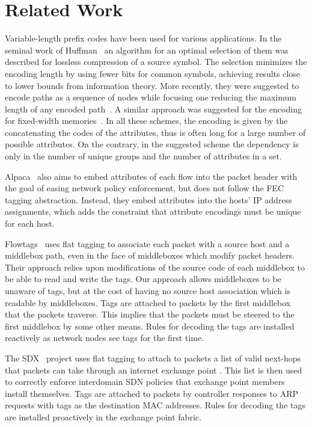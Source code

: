 \section{Related Work} \label{sec:related}

Variable-length prefix codes have been used for various applications. In the seminal work of Huffman~\cite{Huffman} an algorithm for an optimal selection of them was described for lossless compression of a source symbol. The selection minimizes the encoding length by using fewer bits for common symbols, achieving results close to lower bounds from information theory. More recently, they were suggested to encode paths as a sequence of nodes while focusing one reducing the maximum length of any encoded path~\cite{PathEncoding}. A similar approach was suggested for the encoding for fixed-width memories~\cite{FixedMemories}. In all these schemes, the encoding is given by the concatenating the codes of the attributes, thus is often long for a large number of possible attributes. On the contrary, in the suggested scheme the dependency is only in the number of unique groups and the number of attributes in a set.


Alpaca~\cite{alpaca} also aims to embed attributes of each flow into the packet header with the goal of easing network policy enforcement, but does not follow the FEC tagging abstraction. Instead, they embed attributes into the hosts' IP address assignments, which adds the constraint that attribute encodings must be unique for each host. 

Flowtags~\cite{flowtags} uses flat tagging to associate each packet with a source host and a middlebox path, even in the face of middleboxes which modify packet headers. Their approach relies upon modifications of the source code of each middlebox to be able to read and write the tags. Our approach allows middleboxes to be unaware of tags, but at the cost of having no source host association which is readable by middleboxes. Tags are attached to packets by the first middlebox that the packets traverse. This implies that the packets must be steered to the first middlebox by some other means. Rules for decoding the tags are installed reactively as network nodes see tags for the first time. 

The SDX~\cite{sdx} project uses flat tagging to attach to packets a list of valid next-hops that packets can take through an internet exchange point . This list is then used to correctly enforce interdomain SDN policies that exchange point members install themselves. Tags are attached to packets by controller responses to ARP requests with tags as the destination MAC addresses. Rules for decoding the tags are installed proactively in the exchange point fabric.

